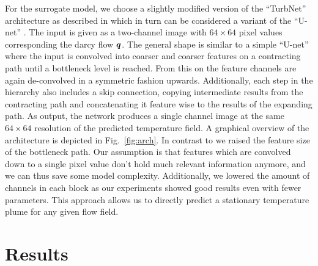 \documentclass{article} %
\begin{document}
For the surrogate model, we choose a slightly modified version of the ``TurbNet'' architecture as described in \citet{Thuerey2019} which in turn can be considered a variant of the ``U-net'' \citep{Ronneberger2015}.
The input is given as a two-channel image with $64\times64$ pixel values corresponding the darcy flow ${\bm{q}}$.
The general shape is similar to a simple ``U-net'' where the input is convolved into coarser and coarser features on a contracting path until a bottleneck level is reached. 
From this on the feature channels are again de-convolved in a symmetric fashion upwards.
Additionally, each step in the hierarchy also includes a skip connection, copying intermediate results from the contracting path and concatenating it feature wise to the results of the expanding path.
As output, the network produces a single channel image at the same $64\times64$ resolution of the predicted temperature field.
A graphical overview of the architecture is depicted in Fig.~\ref{fig:arch}.
In contrast to \citep{Thuerey2019} we raised the feature size of the bottleneck path.
Our assumption is that features which are convolved down to a single pixel value don't hold much relevant information anymore, and we can thus save some model complexity.
Additionally, we lowered the amount of channels in each block as our experiments showed good results even with fewer parameters.
This approach allows us to directly predict a stationary temperature plume for any given flow field.



\section{Results}
\label{sec:results}

\end{document}

